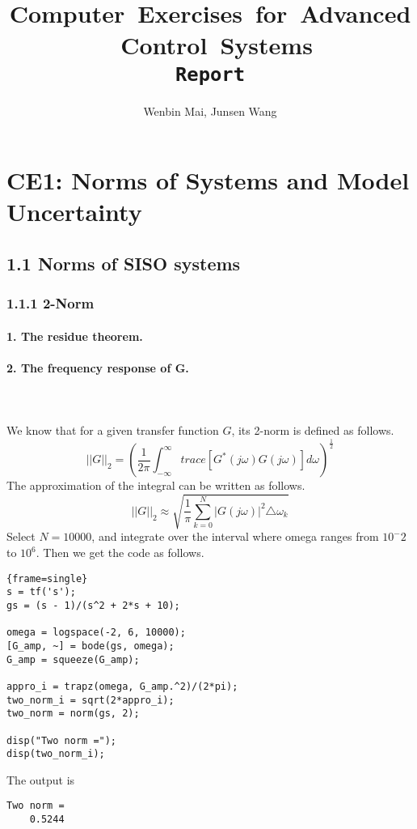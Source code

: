 \documentclass{article}
\title{\mbox{Computer Exercises for Advanced Control Systems}\\ \texttt{Report}}
\author{Wenbin Mai, Junsen Wang}
\begin{document}
\maketitle

\section*{CE1: Norms of Systems and Model Uncertainty}
\subsection*{1.1 Norms of SISO systems}
\subsubsection*{1.1.1 2-Norm}
\paragraph{1. The residue theorem.}

\paragraph{2. The frequency response of G.}~\\~\\
We know that for a given transfer function $G$, its 2-norm is defined as follows.
\[||G||_2=(\frac{1}{2\pi}\int^{\infty}_{-\infty}trace[G^*(j\omega)G(j\omega)]d\omega)^{\frac{1}{2}}\]
The approximation of the integral can be written as follows.
\[||G||_2\approx\sqrt{\frac{1}{\pi}\sum^{N}_{k=0}|G(j\omega)|^2\triangle\omega_k}\]
Select $N=10000$, and integrate over the interval where omega ranges from $10^-2$ to $10^6$. Then we get the code as follows.

\begin{lstlisting}{frame=single}
s = tf('s');
gs = (s - 1)/(s^2 + 2*s + 10);

omega = logspace(-2, 6, 10000);
[G_amp, ~] = bode(gs, omega);
G_amp = squeeze(G_amp);

appro_i = trapz(omega, G_amp.^2)/(2*pi);
two_norm_i = sqrt(2*appro_i);
two_norm = norm(gs, 2);

disp("Two norm =");
disp(two_norm_i);
\end{lstlisting}
The output is 
\begin{lstlisting}[numbers=none]
Two norm =
    0.5244
\end{lstlisting}
\end{document}
